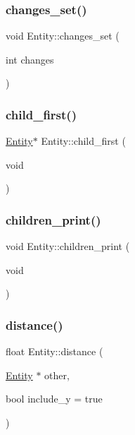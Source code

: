 \mbox{\label{classEntity_aab220a9397ea676632ad622e5b2f214c}} 
\subsubsection{\texorpdfstring{changes\+\_\+set()}{changes\_set()}}
{\footnotesize\ttfamily void Entity\+::changes\+\_\+set (\begin{DoxyParamCaption}\item[{int}]{changes }\end{DoxyParamCaption})}

\mbox{\label{classEntity_a20373262203fef220323dc3f89d3a472}} 
\subsubsection{\texorpdfstring{child\+\_\+first()}{child\_first()}}
{\footnotesize\ttfamily \mbox{\hyperlink{classEntity}{Entity}}$\ast$ Entity\+::child\+\_\+first (\begin{DoxyParamCaption}\item[{void}]{ }\end{DoxyParamCaption})}

\mbox{\label{classEntity_ae38443719b4d82441a987fcda0d293c3}} 
\subsubsection{\texorpdfstring{children\+\_\+print()}{children\_print()}}
{\footnotesize\ttfamily void Entity\+::children\+\_\+print (\begin{DoxyParamCaption}\item[{void}]{ }\end{DoxyParamCaption})}

\mbox{\label{classEntity_a7c5459bec53c3a9a3c5207964f1eab99}} 
\subsubsection{\texorpdfstring{distance()}{distance()}}
{\footnotesize\ttfamily float Entity\+::distance (\begin{DoxyParamCaption}\item[{\mbox{\hyperlink{classEntity}{Entity}} $\ast$}]{other,  }\item[{bool}]{include\+\_\+y = {\ttfamily true} }\end{DoxyParamCaption})}

